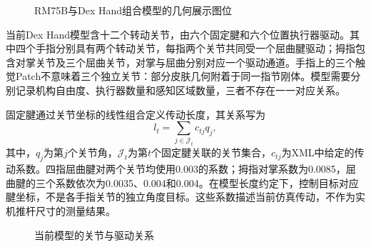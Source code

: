 \begin{figure}[htbp]
  \centering
  \caption{RM75B与Dex Hand组合模型的几何展示图位}
  \label{fig:ch02_robot_model}
\end{figure}

当前Dex Hand模型含十二个转动关节，由六个固定腱和六个位置执行器驱动。其中四个手指分别具有两个转动关节，每指两个关节共同受一个屈曲腱驱动；拇指包含对掌关节及三个屈曲关节，对掌与屈曲分别对应一个驱动通道。手指上的三个触觉Patch不意味着三个独立关节：部分皮肤几何附着于同一指节刚体。模型需要分别记录机构自由度、执行器数量和感知区域数量，三者不存在一一对应关系。

固定腱通过关节坐标的线性组合定义传动长度，其关系写为
\begin{equation}
  l_t=\sum_{j\in\mathcal J_t}c_{tj}q_j,
  \label{eq:ch02_tendon}
\end{equation}
其中，$q_j$为第$j$个关节角，$\mathcal J_t$为第$t$个固定腱关联的关节集合，$c_{tj}$为XML中给定的传动系数。四指屈曲腱对两个关节均使用0.003的系数；拇指对掌系数为0.0085，屈曲腱的三个系数依次为0.0035、0.004和0.004。在模型长度约定下，控制目标对应腱坐标，不是各手指关节的独立角度目标。这些系数描述当前仿真传动，不作为实机推杆尺寸的测量结果。

\begin{figure}[htbp]
  \centering
  \caption{当前模型的关节与驱动关系}
  \label{fig:ch02_drive}
\end{figure}

